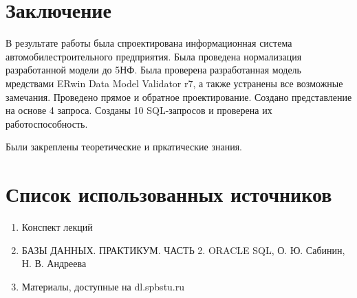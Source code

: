 \newpage

\section{Заключение}
В результате работы была спроектирована информационная система автомобилестроительного предприятия.
Была проведена нормализация разработанной модели до 5НФ.
Была проверена разработанная модель мредствами ERwin Data Model Validator r7, а также устранены все возможные замечания.
Проведено прямое и обратное проектирование.
Создано представление на основе 4 запроса.
Созданы 10 SQL-запросов и проверена их работоспособность.

Были закреплены теоретические и пркатические знания.

\section{Список использованных источников}

\begin{enumerate}

    \item Конспект лекций
    \item БАЗЫ ДАННЫХ. ПРАКТИКУМ. ЧАСТЬ 2. ORACLE SQL, О. Ю. Сабинин, Н. В. Андреева
    \item Материалы, доступные на dl.spbstu.ru

\end{enumerate}

